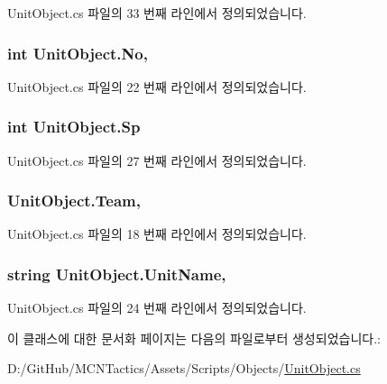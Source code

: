 Unit\+Object.\+cs 파일의 33 번째 라인에서 정의되었습니다.

\subsubsection[{\texorpdfstring{No}{No}}]{\setlength{\rightskip}{0pt plus 5cm}int Unit\+Object.\+No\hspace{0.3cm}{\ttfamily [get]}, {}}\hypertarget{class_unit_object_a87d41a2fa19b25157d5d33dd883572a1}{}\label{class_unit_object_a87d41a2fa19b25157d5d33dd883572a1}


Unit\+Object.\+cs 파일의 22 번째 라인에서 정의되었습니다.

\subsubsection[{\texorpdfstring{Sp}{Sp}}]{\setlength{\rightskip}{0pt plus 5cm}int Unit\+Object.\+Sp\hspace{0.3cm}{\ttfamily [get]}}\hypertarget{class_unit_object_a59a8969cb22dea7f58579517826974dd}{}\label{class_unit_object_a59a8969cb22dea7f58579517826974dd}


Unit\+Object.\+cs 파일의 27 번째 라인에서 정의되었습니다.

\subsubsection[{\texorpdfstring{Team}{Team}}]{ Unit\+Object.\+Team\hspace{0.3cm}{\ttfamily [get]}, {\ttfamily [set]}}\hypertarget{class_unit_object_ab856bbbecf4207710302fc1ecaa75379}{}\label{class_unit_object_ab856bbbecf4207710302fc1ecaa75379}


Unit\+Object.\+cs 파일의 18 번째 라인에서 정의되었습니다.

\subsubsection[{\texorpdfstring{Unit\+Name}{UnitName}}]{\setlength{\rightskip}{0pt plus 5cm}string Unit\+Object.\+Unit\+Name\hspace{0.3cm}{\ttfamily [get]}, {}}\hypertarget{class_unit_object_ad60ea173f3e24fcdd247cd0438438858}{}\label{class_unit_object_ad60ea173f3e24fcdd247cd0438438858}


Unit\+Object.\+cs 파일의 24 번째 라인에서 정의되었습니다.



이 클래스에 대한 문서화 페이지는 다음의 파일로부터 생성되었습니다.\+:\begin{DoxyCompactItemize}
\item 
D\+:/\+Git\+Hub/\+M\+C\+N\+Tactics/\+Assets/\+Scripts/\+Objects/\hyperlink{_unit_object_8cs}{Unit\+Object.\+cs}\end{DoxyCompactItemize}
